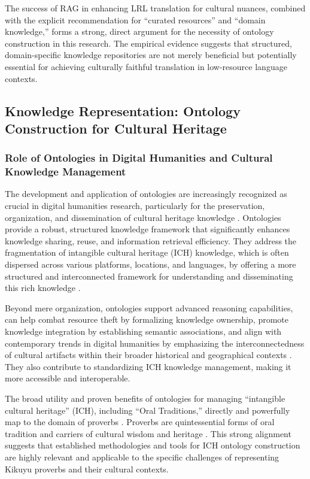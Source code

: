 \documentclass[12pt]{article}
\let\cite\textcite  %
\begin{document}
The success of RAG in enhancing LRL translation for cultural nuances, combined with the explicit recommendation for ``curated resources'' and ``domain knowledge,'' forms a strong, direct argument for the necessity of ontology construction in this research. The empirical evidence suggests that structured, domain-specific knowledge repositories are not merely beneficial but potentially essential for achieving culturally faithful translation in low-resource language contexts.

\subsection{Knowledge Representation: Ontology Construction for Cultural Heritage}

\subsubsection{Role of Ontologies in Digital Humanities and Cultural Knowledge Management}

The development and application of ontologies are increasingly recognized as crucial in digital humanities research, particularly for the preservation, organization, and dissemination of cultural heritage knowledge \cite{w3c2023owl, unesco2023digital}. Ontologies provide a robust, structured knowledge framework that significantly enhances knowledge sharing, reuse, and information retrieval efficiency. They address the fragmentation of intangible cultural heritage (ICH) knowledge, which is often dispersed across various platforms, locations, and languages, by offering a more structured and interconnected framework for understanding and disseminating this rich knowledge \cite{unesco2023digital}.

Beyond mere organization, ontologies support advanced reasoning capabilities, can help combat resource theft by formalizing knowledge ownership, promote knowledge integration by establishing semantic associations, and align with contemporary trends in digital humanities by emphasizing the interconnectedness of cultural artifacts within their broader historical and geographical contexts \cite{unesco2023digital}. They also contribute to standardizing ICH knowledge management, making it more accessible and interoperable.

The broad utility and proven benefits of ontologies for managing ``intangible cultural heritage'' (ICH), including ``Oral Traditions,'' directly and powerfully map to the domain of proverbs \cite{unesco2023digital}. Proverbs are quintessential forms of oral tradition and carriers of cultural wisdom and heritage \cite{smith2023cultural}. This strong alignment suggests that established methodologies and tools for ICH ontology construction are highly relevant and applicable to the specific challenges of representing Kikuyu proverbs and their cultural contexts.
\end{document}
